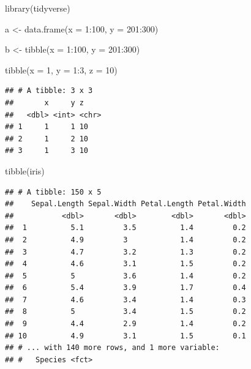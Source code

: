 \documentclass[
]{book}
\newenvironment{Shaded}{\begin{snugshade}}{\end{snugshade}}
\newcommand{\AttributeTok}[1]{\textcolor[rgb]{0.77,0.63,0.00}{#1}}
\newcommand{\DecValTok}[1]{\textcolor[rgb]{0.00,0.00,0.81}{#1}}
\newcommand{\FunctionTok}[1]{\textcolor[rgb]{0.00,0.00,0.00}{#1}}
\newcommand{\NormalTok}[1]{#1}
\newcommand{\OtherTok}[1]{\textcolor[rgb]{0.56,0.35,0.01}{#1}}
\newcommand{\SpecialCharTok}[1]{\textcolor[rgb]{0.00,0.00,0.00}{#1}}
\newcommand{\StringTok}[1]{\textcolor[rgb]{0.31,0.60,0.02}{#1}}
\begin{document}
\begin{Shaded}
\begin{Highlighting}[]
\FunctionTok{library}\NormalTok{(tidyverse)}

\NormalTok{a }\OtherTok{\textless{}{-}} \FunctionTok{data.frame}\NormalTok{(}\AttributeTok{x =} \DecValTok{1}\SpecialCharTok{:}\DecValTok{100}\NormalTok{,}
                \AttributeTok{y =} \DecValTok{201}\SpecialCharTok{:}\DecValTok{300}\NormalTok{)}

\NormalTok{b }\OtherTok{\textless{}{-}} \FunctionTok{tibble}\NormalTok{(}\AttributeTok{x =} \DecValTok{1}\SpecialCharTok{:}\DecValTok{100}\NormalTok{,}
            \AttributeTok{y =} \DecValTok{201}\SpecialCharTok{:}\DecValTok{300}\NormalTok{)}

\FunctionTok{tibble}\NormalTok{(}\AttributeTok{x =} \DecValTok{1}\NormalTok{, }
       \AttributeTok{y =} \DecValTok{1}\SpecialCharTok{:}\DecValTok{3}\NormalTok{, }
       \AttributeTok{z =} \StringTok{\textquotesingle{}10\textquotesingle{}}\NormalTok{)}
\end{Highlighting}
\end{Shaded}

\begin{verbatim}
## # A tibble: 3 x 3
##       x     y z    
##   <dbl> <int> <chr>
## 1     1     1 10   
## 2     1     2 10   
## 3     1     3 10
\end{verbatim}

\begin{Shaded}
\begin{Highlighting}[]
\FunctionTok{tibble}\NormalTok{(iris)}
\end{Highlighting}
\end{Shaded}

\begin{verbatim}
## # A tibble: 150 x 5
##    Sepal.Length Sepal.Width Petal.Length Petal.Width
##           <dbl>       <dbl>        <dbl>       <dbl>
##  1          5.1         3.5          1.4         0.2
##  2          4.9         3            1.4         0.2
##  3          4.7         3.2          1.3         0.2
##  4          4.6         3.1          1.5         0.2
##  5          5           3.6          1.4         0.2
##  6          5.4         3.9          1.7         0.4
##  7          4.6         3.4          1.4         0.3
##  8          5           3.4          1.5         0.2
##  9          4.4         2.9          1.4         0.2
## 10          4.9         3.1          1.5         0.1
## # ... with 140 more rows, and 1 more variable:
## #   Species <fct>
\end{verbatim}
\end{document}
